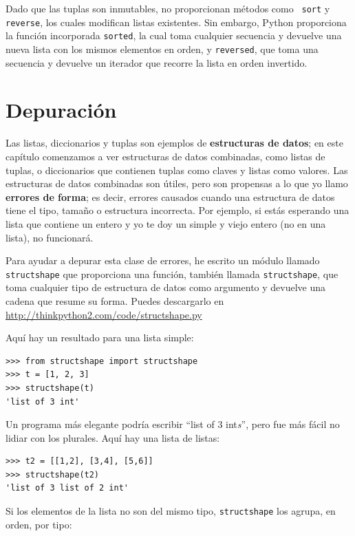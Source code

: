 \documentclass[10pt]{book}
\begin{document}
Dado que las tuplas son inmutables, no proporcionan métodos como {\tt
  sort} y {\tt reverse}, los cuales modifican listas existentes.  Sin embargo, Python
proporciona la función incorporada {\tt sorted}, la cual toma cualquier secuencia
y devuelve una nueva lista con los mismos elementos en orden, y
{\tt reversed}, que toma una secuencia y devuelve un iterador que
recorre la lista en orden invertido.
 


\section{Depuración}

Las listas, diccionarios y tuplas son ejemplos de {\bf estructuras
  de datos}; en este capítulo comenzamos a ver estructuras de datos
combinadas, como listas de tuplas, o diccionarios que contienen tuplas
como claves y listas como valores.  Las estructuras de datos combinadas son útiles,
pero son propensas a lo que yo llamo {\bf errores de forma}; es decir, errores
causados cuando una estructura de datos tiene el tipo, tamaño o estructura
incorrecta. Por ejemplo, si estás esperando una lista que contiene un entero y yo
te doy un simple y viejo entero (no en una lista), no funcionará.

Para ayudar a depurar esta clase de errores, he escrito un módulo
llamado {\tt structshape} que proporciona una función, también llamada
{\tt structshape}, que toma cualquier tipo de estructura de datos como
argumento y devuelve una cadena que resume su forma.
Puedes descargarlo en \url{http://thinkpython2.com/code/structshape.py}

Aquí hay un resultado para una lista simple:

\begin{verbatim}
>>> from structshape import structshape
>>> t = [1, 2, 3]
>>> structshape(t)
'list of 3 int'
\end{verbatim}
%
Un programa más elegante podría escribir ``list of 3 int{\em s}'', pero
fue más fácil no lidiar con los plurales.  Aquí hay una lista de listas:

\begin{verbatim}
>>> t2 = [[1,2], [3,4], [5,6]]
>>> structshape(t2)
'list of 3 list of 2 int'
\end{verbatim}
%
Si los elementos de la lista no son del mismo tipo,
{\tt structshape} los agrupa, en orden, por tipo:
\end{document}
